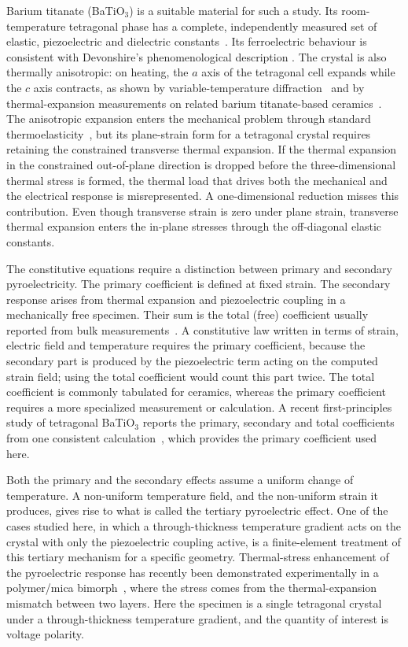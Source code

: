 \documentclass[a4paper,12pt]{elsarticle}
\begin{document}
Barium titanate (BaTiO$_3$) is a suitable material for such a study. Its
room-temperature tetragonal phase has a complete, independently measured set of
elastic, piezoelectric and dielectric constants~\cite{Zgonik1994,Berlincourt1958}. Its ferroelectric behaviour is consistent with Devonshire's phenomenological description \cite{Devonshire1949}. The crystal is also thermally anisotropic: on
heating, the $a$ axis of the tetragonal cell expands while the $c$ axis contracts, as
shown by variable-temperature diffraction~\cite{Nakatani2016} and by thermal-expansion
measurements on related barium titanate-based ceramics~\cite{Han2015,He2015Thermal}.
The anisotropic expansion enters the mechanical problem through standard
thermoelasticity~\cite{BoleyWeiner1997}, but its plane-strain form for a
tetragonal crystal requires retaining the constrained transverse thermal expansion.
If the thermal expansion in the constrained out-of-plane direction is dropped before
the three-dimensional thermal stress is formed, the thermal load that drives both the
mechanical and the electrical response is misrepresented.
A one-dimensional reduction misses this contribution. Even though transverse
strain is zero under plane strain, transverse thermal expansion enters the
in-plane stresses through the off-diagonal elastic constants.

The constitutive equations require a distinction between primary and
secondary pyroelectricity. The primary coefficient is defined at fixed
strain. The secondary response arises from thermal expansion and
piezoelectric coupling in a mechanically free specimen. Their
sum is the total (free) coefficient usually reported from bulk measurements~\cite{Tagantsev1991}. A constitutive law written in terms
of strain, electric field and temperature requires the primary coefficient, because the
secondary part is produced by the piezoelectric term acting on the computed strain
field; using the total coefficient would count this part twice. The total coefficient
is commonly tabulated for ceramics, whereas the primary coefficient requires a more
specialized measurement or calculation. A recent first-principles study of tetragonal
BaTiO$_3$ reports the primary, secondary and total coefficients from one consistent
calculation~\cite{EklundKarttunen2023}, which provides the primary coefficient used here.

Both the primary and the secondary effects assume a uniform change of temperature. A
non-uniform temperature field, and the non-uniform strain it produces, gives rise to
what is called the tertiary pyroelectric effect. One of the cases
studied here, in which a through-thickness temperature gradient acts on the
crystal with only the piezoelectric coupling active, is a finite-element treatment of
this tertiary mechanism for a specific geometry. Thermal-stress enhancement of the
pyroelectric response has recently been demonstrated experimentally in a polymer/mica
bimorph~\cite{Su2026ThermalStressPyro}, where the stress comes from the
thermal-expansion mismatch between two layers. Here the specimen is a single tetragonal crystal under a through-thickness
temperature gradient, and the quantity of interest is voltage polarity.
\end{document}
